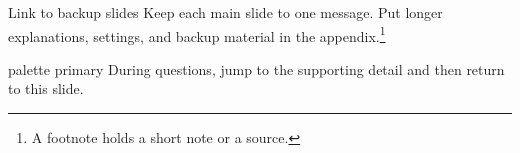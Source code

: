 \begin{frame}[label=technique-navigation]{Link to backup slides}
  Keep each main slide to \alert{one message}.
  Put longer explanations, settings, and backup material in the appendix.\footnote{A footnote holds a short note or a source.}

  \medskip
  \begin{beamercolorbox}[sep=.8em,wd=\linewidth]{palette primary}
    During questions, jump to the supporting detail and then return to
    this slide.
  \end{beamercolorbox}
  \medskip
  \hyperlink{reference-start}{}
\end{frame}
